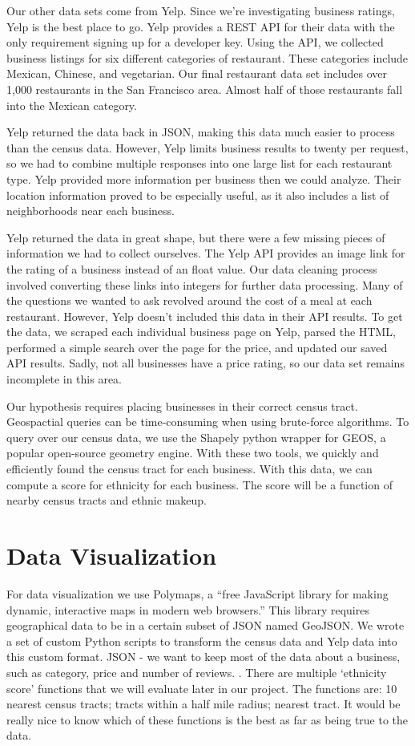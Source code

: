 \documentclass[11pt,twocolumn]{article}
\begin{document}
Our other data sets come from Yelp. Since we're investigating business ratings, Yelp is the best place to go. Yelp provides a REST API for their data with the only requirement signing up for a developer key. Using the API, we collected business listings for six different categories of restaurant. These categories include Mexican, Chinese, and vegetarian. Our final restaurant data set includes over 1,000 restaurants in the San Francisco area. Almost half of those restaurants fall into the Mexican category.

Yelp returned the data back in JSON, making this data much easier to process than the census data. However, Yelp limits business results to twenty per request, so we had to combine multiple responses into one large list for each restaurant type. Yelp provided more information per business then we could analyze. Their location information proved to be especially useful, as it also includes a list of neighborhoods near each business.

Yelp returned the data in great shape, but there were a few missing pieces of information we had to collect ourselves. The Yelp API provides an image link for the rating of a business instead of an float value. Our data cleaning process involved converting these links into integers for further data processing. Many of the questions we wanted to ask revolved around the cost of a meal at each restaurant. However, Yelp doesn't included this data in their API results. To get the data, we scraped each individual business page on Yelp, parsed the HTML, performed a simple search over the page for the price, and updated our saved API results. Sadly, not all businesses have a price rating, so our data set remains incomplete in this area.

Our hypothesis requires placing businesses in their correct census tract. Geospactial queries can be time-consuming when using brute-force algorithms. To query over our census data, we use the Shapely python wrapper for GEOS, a popular open-source geometry engine. With these two tools, we quickly and efficiently found the census tract for each business. With this data, we can compute a score for ethnicity for each business. The score will be a function of nearby census tracts and ethnic makeup.

\section{Data Visualization}

For data visualization we use Polymaps, a ``free JavaScript library for making dynamic, interactive maps in modern web browsers.'' This library requires geographical data to be in a certain subset of JSON named GeoJSON. We wrote a set of custom Python scripts to transform the census data and Yelp data into this custom format. JSON - we want to keep most of the data about a business, such as category, price and number of reviews. . There are multiple ‘ethnicity score’ functions that we will evaluate later in our project. The functions are: 10 nearest census tracts; tracts within a half mile radius; nearest tract. It would be really nice to know which of these functions is the best as far as being true to the data.
\end{document}
